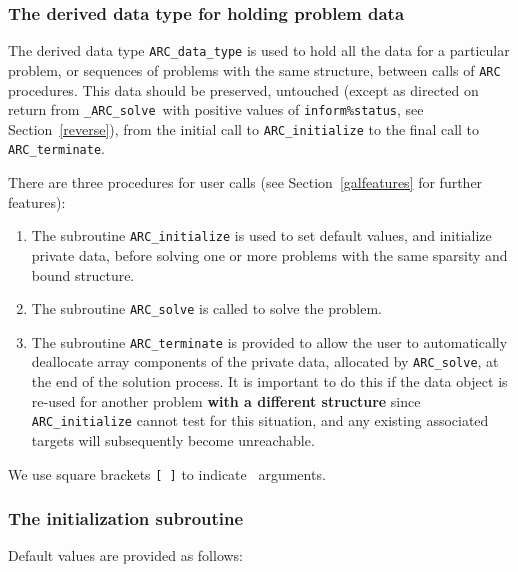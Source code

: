 \documentclass{galahad}
\newcommand{\packagename}{ARC}
\newcommand{\fullpackagename}{\libraryname\_\packagename}
\newcommand{\solver}{{\tt \fullpackagename\_solve}}
\begin{document}

\subsubsection{The derived data type for holding problem data}\label{typedata}
The derived data type
{\tt \packagename\_data\_type}
is used to hold all the data for a particular problem,
or sequences of problems with the same structure, between calls of
{\tt \packagename} procedures.
This data should be preserved, untouched (except as directed on
return from \solver\ with positive values of {\tt inform\%status}, see
Section~\ref{reverse}),
from the initial call to
{\tt \packagename\_initialize}
to the final call to
{\tt \packagename\_terminate}.





\galarguments
There are three procedures for user calls
(see Section~\ref{galfeatures} for further features):

\begin{enumerate}
\item The subroutine
      {\tt \packagename\_initialize}
      is used to set default values, and initialize private data,
      before solving one or more problems with the
      same sparsity and bound structure.
\item The subroutine
      {\tt \packagename\_solve}
      is called to solve the problem.
\item The subroutine
      {\tt \packagename\_terminate}
      is provided to allow the user to automatically deallocate array
       components of the private data, allocated by
       {\tt \packagename\_solve},
       at the end of the solution process.
       It is important to do this if the data object is re-used for another
       problem {\bf with a different structure}
       since {\tt \packagename\_initialize} cannot test for this situation,
       and any existing associated targets will subsequently become unreachable.
\end{enumerate}
We use square brackets {\tt [ ]} to indicate \optional\ arguments.


\subsubsection{The initialization subroutine}\label{subinit}
 Default values are provided as follows:
\vspace*{1mm}
\end{document}
